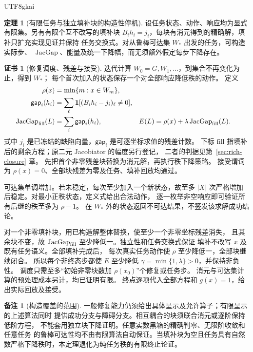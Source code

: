 \documentclass[12pt]{report}
\makeatletter
\theoremstyle{definition}
\newtheorem{theorem}{定理}[chapter]
\newtheorem{remark}{备注}[chapter]
\newtheorem{Certificate}{证书}[chapter]
\renewenvironment{proof}[1][\proofname]{\par
  \pushQED{\qed}\normalfont
  \topsep6\p@\@plus6\p@\relax
  \trivlist
  \item[\hskip\labelsep\normalfont #1\@addpunct{.}]\ignorespaces
}{
  \popQED\endtrivlist\@endpefalse
}
\newcommand{\JacGap}{\operatorname{JacGap}}
\makeatother
\begin{document}
\begin{CJK*}{UTF8}{gkai}
\begin{theorem}[有限任务与独立填补块的构造性停机]
\label{thm:constructive-stop}
设任务状态、动作、响应均为显式有限集。另有有限个互不改写的填补块
\(B_i h_i=j_i\)，每块有消元得到的精确解，填补只扩充实现见证并保持
任务交换式。对从鲁棒可达集 \(W_*\) 出发的任务，可构造实际步、
\(\JacGap\)、能量及统一下降幅，而无须额外假定每步下降存在。
\end{theorem}
\begin{Certificate}[修复调度、残差与接受]
迭代计算 \(W_0=G,W_1,\ldots\)，到集合不再变化为止，得到 \(W_*\)；
每个首次加入的状态保存一个对全部响应降低秩的动作。
定义
\[
\begin{aligned}
\rho(x)&=\min\{m:x\in W_m\},\\
\mathsf{gap}_i(h_i)&=\sum_\ell\mathbf1[(B_i h_i-j_i)_\ell\ne0],\\
\JacGap_{\rm fill}(L)&=\sum_i\mathsf{gap}_i(h_i),&
E(L)&=\rho(x)+\lambda\JacGap_{\rm fill}(L).
\end{aligned}
\]
式中 \(j_i\) 是已冻结的缺陷向量，\(\mathsf{gap}_i\) 是可逐坐标求值的残差计数。
下标 \(\mathrm{fill}\) 指填补后的剩余方程；原二元 Jacobiator 的幅度另行登记，
二者的判据见第~\ref{sec:rich-closure} 章。
先把首个非零残差块替换为消元解，再执行秩下降策略。
接受谓词为 \(\rho(x)=0\)、全部块残差为零及任务、填补回放均通过。
\end{Certificate}
\begin{proof}
可达集单调增加。若未稳定，每次至少加入一个新状态，故至多
\(|X|\) 次严格增加后稳定。对最小正秩状态，定义式给出合法动作，
逐一枚举非空响应即可验证所有后继的秩至多为 \(\rho-1\)。
在 \(W_*\) 外的状态返回不可达结果，不签发该求解成功结论。

对一个非零填补块，用已构造解整体替换，使至少一个非零坐标残差消失，
且其余块不变，故 \(\JacGap_{\rm fill}\) 至少降低一。独立性和任务交换式保证
填补不改写 \(x\) 及既有任务语义。全部填补完成后，
每次真实任务动作使 \(\rho\) 至少降低一，全部块继续闭合。
所以每个非终态步都使 \(E\) 至少降低
\(\gamma=\min\{1,\lambda\}>0\)，并保持非负性。
调度只需至多“初始非零块数加 \(\rho(x_0)\)”个修复或任务步。
消元与可达集计算的预处理成本另计，均已证明有限。
终点逐项代入全部方程和 \(g(x)=1\)，给出实际回放及接受。
\end{proof}

\begin{remark}[构造覆盖的范围]
一般修复能力仍须给出具体呈示及允许算子；有限呈示的上述算法同时
提供成功分支与障碍分支。相互耦合的块须联合消元或逐阶保持低阶方程，
不能套用独立块下降证明。任意实数黑箱的精确判零、无限阶收敛和任意任务
的鲁棒可达性均不由有限算法自动保证。当填补块为空且任务具有自然数严格下降秩时，本定理退化为纯任务秩的有限终止论证。
\end{remark}


\end{CJK*}
\end{document}
